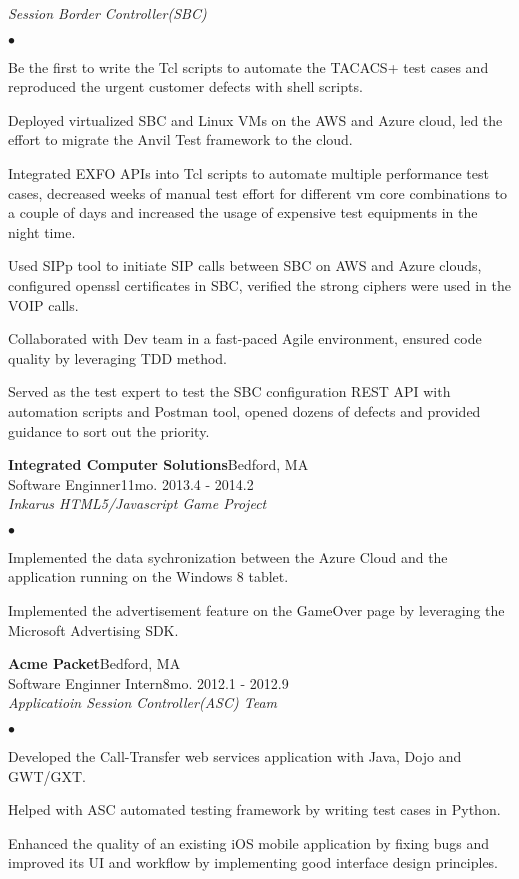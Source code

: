 \documentclass[10pt]{article}
\newcommand{\company}[5]{
    \large{\textbf{#1}}\hfill \small{#3}\\
    #2\hfill \small{#4}\small{#5}\\
}
\newcommand{\project}[1]{\checkmark\normalsize{{\emph{#1}}}\\}
\newenvironment{achievements}
    {\begin{list}
        {$\bullet$}{\topsep 0pt \itemsep -1pt}} 
    {\end{list}}
\begin{document}
\project{Session Border Controller(SBC)}
  \begin{achievements}
\item Be the first to write the Tcl scripts to automate the TACACS+ test cases and reproduced the urgent customer defects with shell scripts.
\item Deployed virtualized SBC and Linux VMs on the AWS and Azure cloud, led the effort to migrate the Anvil Test framework to the cloud.
\item Integrated EXFO APIs into Tcl scripts to automate multiple performance test cases, decreased weeks of manual test effort for different vm core combinations to a couple of days and increased the usage of expensive test equipments in the night time.
\item Used SIPp tool to initiate SIP calls between SBC on AWS and Azure clouds, configured openssl certificates in SBC, verified the strong ciphers were used in the VOIP calls.
\item Collaborated with Dev team in a fast-paced Agile environment, ensured code quality by leveraging TDD method.
\item Served as the test expert to test the SBC configuration REST API with automation scripts and Postman tool, opened dozens of defects and provided guidance to sort out the priority.
  \end{achievements}

\vspace*{5pt}

  \company{Integrated Computer Solutions}{Software Enginner}{Bedford, MA}{11mo. }{2013.4 - 2014.2}

    \project{Inkarus HTML5/Javascript Game Project}
  \begin{achievements}
\item Implemented the data sychronization between the Azure Cloud and the application running on the Windows 8 tablet.
\item Implemented the advertisement feature on the GameOver page by leveraging the Microsoft Advertising SDK.
  \end{achievements}

\vspace*{5pt}
  \company{Acme Packet}{Software Enginner Intern}{Bedford, MA}{8mo. }{2012.1 - 2012.9}

  \project{Applicatioin Session Controller(ASC) Team}
  \begin{achievements}
\item Developed the Call-Transfer web services application with Java, Dojo and GWT/GXT.
\item Helped with ASC automated testing framework by writing test cases in Python.
\item Enhanced the quality of an existing iOS mobile application by fixing bugs and improved its UI and workflow by implementing good interface design principles.
  \end{achievements}
\end{document}
